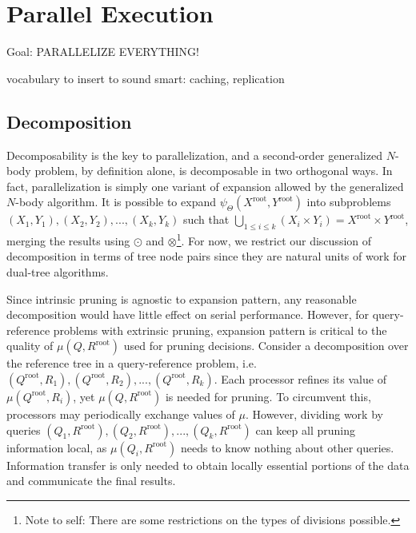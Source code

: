 \documentclass[times, leqno,twocolumn]{article}
\newcommand{\authornote}[1]{\footnote{Note to self: #1}}
\newcommand{\authorsnote}[1]{\authornote{#1}}
\newcommand{\Union}{\bigcup}
\newcommand{\gnp}{\psi_{\Theta}}
\newcommand{\kdroot}[1]{#1^{\text{root}}}
\newcommand{\inmu}{\mu}
\begin{document}
\section{Parallel Execution}

Goal: PARALLELIZE EVERYTHING!

vocabulary to insert to sound smart: caching, replication

\subsection{Decomposition}

Decomposability is the key to parallelization, and a second-order generalized $N$-body problem, by definition alone, is decomposable in two orthogonal ways.
In fact, parallelization is simply one variant of expansion allowed by the generalized $N$-body algorithm.
It is possible to expand $\gnp(\kdroot{X}, \kdroot{Y})$ into subproblems $(X_1,Y_1), (X_2,Y_2), ..., (X_k, Y_k)$ such that $\Union_{1 \leq i \leq k} (X_i \times Y_i) = \kdroot{X} \times \kdroot{Y}$, merging the results using $\odot$ and $\otimes$\authorsnote{There are some restrictions on the types of divisions possible.}.
For now, we restrict our discussion of decomposition in terms of tree node pairs since they are natural units of work for dual-tree algorithms.

Since intrinsic pruning is agnostic to expansion pattern, any reasonable decomposition would have little effect on serial performance.
However, for query-reference problems with extrinsic pruning, expansion pattern is critical to the quality of $\inmu(Q, \kdroot{R})$ used for pruning decisions.
Consider a decomposition over the reference tree in a query-reference problem, i.e. $(\kdroot{Q}, R_1), (\kdroot{Q}, R_2), ..., (\kdroot{Q}, R_k)$.
Each processor refines its value of $\inmu(\kdroot{Q}, R_i)$, yet $\inmu(Q, \kdroot{R})$ is needed for pruning.
To circumvent this, processors may periodically exchange values of $\mu$.
However, dividing work by queries $(Q_1, \kdroot{R}), (Q_2, \kdroot{R}), ..., (Q_k, \kdroot{R})$ can keep all pruning information local, as $\inmu(Q_i, \kdroot{R})$ needs to know nothing about other queries.
Information transfer is only needed to obtain locally essential portions of the data and communicate the final results.
\end{document}
